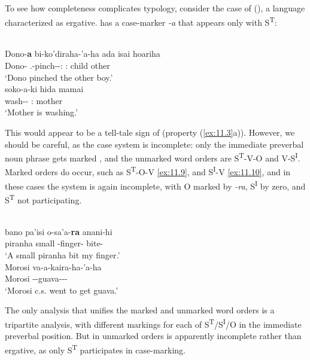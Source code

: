 \documentclass[output=paper]{langsci/langscibook}
\begin{document}
To see how completeness complicates  typology, consider the case of
 (\citealt{ChapmanDerbyshire1991}), a language characterized as
ergative.  has a case-marker \emph{-a} that appears only with
S\textsuperscript{T}:

\ea%
    \label{ex:11.7} {\parencite[164]{ChapmanDerbyshire1991}}\\
    \gll Dono-\textbf{a}  bi-ko’diraha-’a-ha      ada    isai    hoariha\\
        Dono-\Erg{}  \Tsg.\Tr{}-pinch-\Asp-\Th:\M{}  \Dem:\M{}  child  other\\
    \glt ‘Dono pinched the other boy.’
\ex%
    \label{ex:11.8} {\parencite[163]{ChapmanDerbyshire1991}}\\
    \gll soko-a-ki      hida    mamai\\
        wash-\Detr-\Nth{}  \Dem:\glossF{}  mother\\
    \glt ‘Mother is washing.’
\z

This would appear to be a tell-tale sign of  (property (\ref{ex:11.3}a)).
However, we should be careful, as the case system is incomplete: only the
immediate preverbal noun phrase gets marked
\parencite[250]{ChapmanDerbyshire1991}, and the unmarked word orders are
S\textsuperscript{T}{}-V-O and V-S\textsuperscript{I}. Marked orders do occur,
such as S\textsuperscript{T}{}-O-V \eqref{ex:11.9}, and S\textsuperscript{I}{}-V \eqref{ex:11.10}, and
in these cases the system is again incomplete, with O marked by \emph{{}-ra},
S\textsuperscript{I} by zero, and S\textsuperscript{T} not participating.

\ea%
    \label{ex:11.9} {\parencite[197]{ChapmanDerbyshire1991}}\\
    \gll bano    pa'isi  o-sa'a-\textbf{ra}      anani-hi\\
        piranha  small  \Fsg{}-finger-\Obj{}  bite-\Th{}\\
    \glt ‘A small piranha bit my finger.’
\ex%
    \label{ex:11.10}
    {\parencite[197]{ChapmanDerbyshire1991}}\\
    \gll Morosi  va-a-kaira-ha-’a-ha\\
        Morosi  \Tpl{}-\Vblz{}-guava-\Prt-\Asp-\Th{}\\
    \glt ‘Morosi c.s. went to get guava.’
\z

The only analysis that unifies the marked and unmarked word orders is a
tripartite analysis, with different markings for each of
S\textsuperscript{T}/S\textsuperscript{I}/O in the immediate preverbal
position. But in unmarked orders  is apparently incomplete rather than
ergative, as only S\textsuperscript{T} participates in case-marking.
\end{document}
